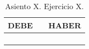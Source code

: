 \begin{table}[H]
    \centering
    \begin{tabular}{|p{2cm}|p{8cm}|p{2cm}|}
    \hline
    \rowcolor{blue!30}
    \textbf{DEBE} & \textbf{} & \textbf{HABER} \\
    \hline
    &  & \\
    \hline
    &  & \\
    \hline
    &  & \\
    \hline
    &  & \\
    \hline
    \end{tabular}
    \caption{Asiento X. Ejercicio X.}
    \label{tabla:asientoXejXTx}
\end{table}
